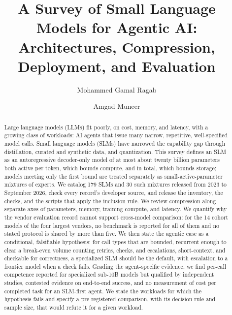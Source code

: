 \documentclass[acmsmall,screen,review]{acmart}
\begin{document}
\title[A Survey of Small Language Models for Agentic AI]{A Survey of Small
  Language Models for Agentic AI: Architectures, Compression, Deployment, and
  Evaluation}

\author{Mohammed Gamal Ragab}

\author{Amgad Muneer}

\renewcommand{\shortauthors}{Ragab and Muneer}

\begin{abstract}
  Large language models (LLMs) fit poorly, on cost, memory, and latency, with a
  growing class of workloads: AI agents that issue many narrow, repetitive,
  well-specified model calls. Small language models (SLMs) have narrowed the
  capability gap through distillation, curated and synthetic data, and
  quantization. This survey defines an SLM as an autoregressive decoder-only
  model of at most about twenty billion parameters both active per token, which
  bounds compute, and in total, which bounds storage; models meeting only the
  first bound are treated separately as small-active-parameter mixtures of
  experts. We catalog 179 SLMs and 30 such mixtures released from 2023 to
  September 2026, check every record's developer source, and release the
  inventory, the checks, and the scripts that apply the inclusion rule. We review
  compression along separate axes of parameters, memory, training compute, and
  latency. We quantify why the vendor evaluation record cannot support
  cross-model comparison: for the 14 cohort models of the four largest vendors,
  no benchmark is reported for all of them and no stated protocol is shared by
  more than five. We then state the agentic case as a conditional, falsifiable
  hypothesis: for call types that are bounded, recurrent enough to clear a
  break-even volume counting retries, checks, and escalations, short-context,
  and checkable for correctness, a specialized SLM should be the default, with
  escalation to a frontier model when a check fails. Grading the agent-specific
  evidence, we find per-call competence reported for specialized sub-10B models
  but qualified by independent studies, contested evidence on end-to-end
  success, and no measurement of cost per completed task for an SLM-first
  agent. We state the workloads for which the hypothesis fails and specify a
  pre-registered comparison, with its decision rule and sample size, that would
  refute it for a given workload.
\end{abstract}
\end{document}

